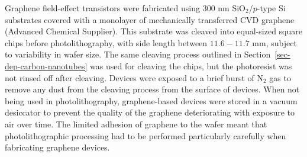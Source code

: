 \documentclass[
  a4paper,
]{scrbook}
\begin{document}
Graphene field-effect transistors were fabricated using 300 nm
SiO\(_2\)/\(p\)-type Si substrates covered with a monolayer of
mechanically transferred CVD graphene (Advanced Chemical Supplier). This
substrate was cleaved into equal-sized square chips before
photolithography, with side length between \(11.6-11.7\) mm, subject to
variability in wafer size. The same cleaving process outlined in
Section~\ref{sec-dep-carbon-nanotubes} was used for cleaving the chips,
but the photoresist was not rinsed off after cleaving. Devices were
exposed to a brief burst of N\(_2\) gas to remove any dust from the
cleaving process from the surface of devices. When not being used in
photolithography, graphene-based devices were stored in a vacuum
desiccator to prevent the quality of the graphene deteriorating with
exposure to air over time. The limited adhesion of graphene to the wafer
meant that photolithographic processing had to be performed particularly
carefully when fabricating graphene devices.
\end{document}
